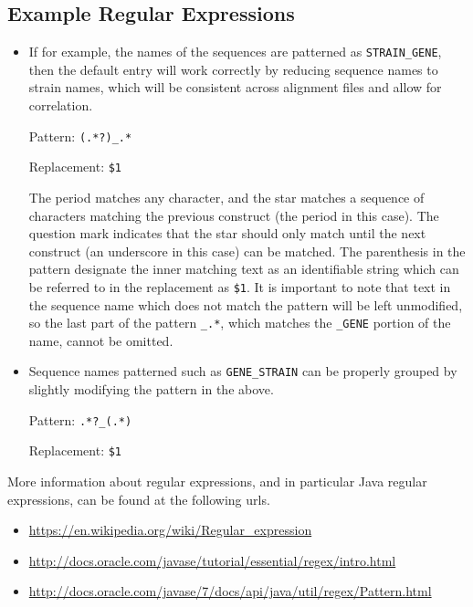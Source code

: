 \documentclass[12pt,letterpaper]{article}
\begin{document}
\subsection{Example Regular Expressions}

\begin{itemize}
\item
    If for example, the names of the sequences are patterned as
    \texttt{STRAIN\_GENE}, then the default entry will work correctly by
    reducing sequence names to strain names, which will be consistent across
    alignment files and allow for correlation.

    Pattern: \texttt{(.*?)\_.*}

    Replacement: \texttt{\$1}

    The period matches any character, and the star matches a sequence of
    characters matching the previous construct (the period in this case).  The
    question mark indicates that the star should only match until the next
    construct (an underscore in this case) can be matched.  The parenthesis in
    the pattern designate the inner matching text as an identifiable string
    which can be referred to in the replacement as \texttt{\$1}.  It is
    important to note that text in the sequence name which does not match the
    pattern will be left unmodified, so the last part of the pattern
    \texttt{\_.*}, which matches the \texttt{\_GENE} portion of the name,
    cannot be omitted.

\item
    Sequence names patterned such as \texttt{GENE\_STRAIN} can be properly
    grouped by slightly modifying the pattern in the above.

    Pattern: \texttt{.*?\_(.*)}

    Replacement: \texttt{\$1}

\end{itemize}

More information about regular expressions, and in particular Java regular
expressions, can be found at the following urls.

\begin{itemize}
\item
    \url{https://en.wikipedia.org/wiki/Regular\_expression}
\item
    \url{http://docs.oracle.com/javase/tutorial/essential/regex/intro.html}
\item
    \url{http://docs.oracle.com/javase/7/docs/api/java/util/regex/Pattern.html}
\end{itemize}
\end{document}
